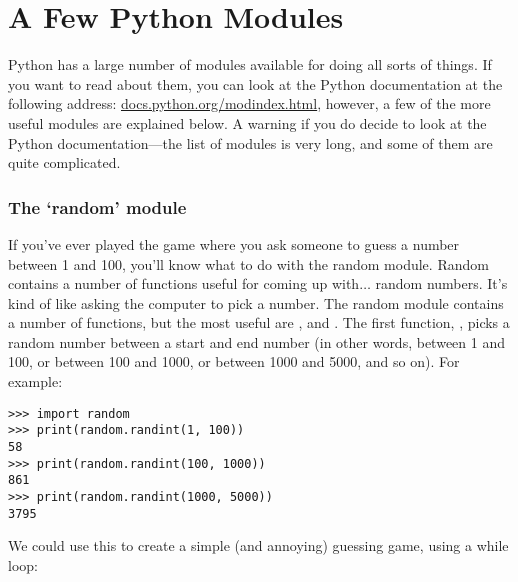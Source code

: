 

\chapter{A Few Python Modules}\label{app:afewpythonmodules}

Python has a large number of modules available for doing all sorts of things.  If you want to read about them, you can look at the Python documentation at the following address: \href{http://docs.python.org/modindex.html}{docs.python.org/modindex.html}, however, a few of the more useful modules are explained below.  A warning if you do decide to look at the Python documentation---the list of modules is very long, and some of them are quite complicated.

\subsection*{The `random' module}

If you've ever played the game where you ask someone to guess a number between 1 and 100, you'll know what to do with the random module.  Random contains a number of functions useful for coming up with$\ldots$ random numbers. It's kind of like asking the computer to pick a number. The random module contains a number of functions, but the most useful are ,  and . The first function, ,  picks a random number between a start and end number (in other words, between 1 and 100, or between 100 and 1000, or between 1000 and 5000, and so on).  For example:

\begin{listingignore}
\begin{verbatim}
>>> import random
>>> print(random.randint(1, 100))
58
>>> print(random.randint(100, 1000))
861
>>> print(random.randint(1000, 5000))
3795
\end{verbatim}
\end{listingignore}

We could use this to create a simple (and annoying) guessing game, using a while loop:


